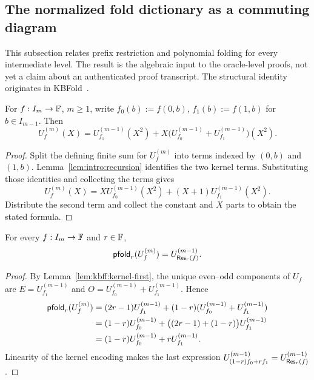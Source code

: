 \subsection{The normalized fold dictionary as a commuting diagram}\label{sec:kbfoldfold:dictionary}

This subsection relates prefix restriction and polynomial folding for every intermediate level. The result is the algebraic input to the oracle-level proofs, not yet a claim about an authenticated proof transcript. The structural identity originates in KBFold~\cite{MkhidaKBFold2026}.

\begin{lemma}\label{lem:kbff:kernel-first}
For $f:I_m\to\mathbb{F}$, $m\geq1$, write $f_0(b):=f(0,b)$,
$f_1(b):=f(1,b)$ for $b\in I_{m-1}$. Then
\[
 U_f^{(m)}(X)=
 U_{f_1}^{(m-1)}(X^2)
 +X\bigl(U_{f_0}^{(m-1)}+U_{f_1}^{(m-1)}\bigr)(X^2).
\]
\end{lemma}
\begin{proof}
Split the defining finite sum for $U_f^{(m)}$ into terms
indexed by $(0,b)$ and $(1,b)$. Lemma~\ref{lem:intro:recursion}
identifies the two kernel terms. Substituting those identities
and collecting the terms gives
\[
 U_f^{(m)}(X)
 =XU_{f_0}^{(m-1)}(X^2)+(X+1)U_{f_1}^{(m-1)}(X^2).
\]
Distribute the second term and collect the constant and $X$ parts to obtain the stated formula.
\end{proof}

\begin{lemma}\label{lem:kbff:intertwining}
For every $f:I_m\to\mathbb{F}$ and $r\in\mathbb{F}$,
\[
 \mathsf{pfold}_r(U_f^{(m)})=U_{\mathsf{Res}_r(f)}^{(m-1)}.
\]
\end{lemma}
\begin{proof}
By Lemma~\ref{lem:kbff:kernel-first}, the unique even--odd components of $U_f$ are $E=U_{f_1}^{(m-1)}$ and
$O=U_{f_0}^{(m-1)}+U_{f_1}^{(m-1)}$. Hence
\begin{align*}
 \mathsf{pfold}_r(U_f^{(m)})
 &=(2r-1)U_{f_1}^{(m-1)}
   +(1-r)(U_{f_0}^{(m-1)}+U_{f_1}^{(m-1)})\\
 &=(1-r)U_{f_0}^{(m-1)}
   +\bigl((2r-1)+(1-r)\bigr)U_{f_1}^{(m-1)}\\
 &=(1-r)U_{f_0}^{(m-1)}+rU_{f_1}^{(m-1)}.
\end{align*}
Linearity of the kernel encoding makes the last expression
$U_{(1-r)f_0+rf_1}^{(m-1)}=U_{\mathsf{Res}_r(f)}^{(m-1)}$.
\end{proof}

